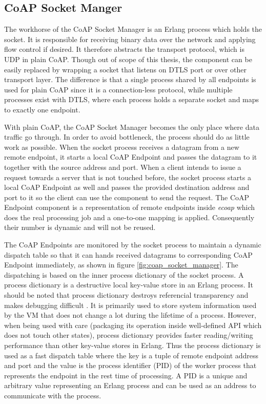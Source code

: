 \begin{figure}
\label{fig:ecoap_general_arch}
\end{figure}

\subsection{CoAP Socket Manger}\label{socket_manager}

The workhorse of the CoAP Socket Manager is an Erlang process which holds the socket. It is responsible for receiving binary data over the network and applying flow control if desired. It therefore abstracts the transport protocol, which is UDP in plain CoAP. Though out of scope of this thesis, the component can be easily replaced by wrapping a socket that listens on DTLS port or over other transport layer. The difference is that a single process shared by all endpoints is used for plain CoAP since it is a connection-less protocol, while multiple processes exist with DTLS, where each process holds a separate socket and maps to exactly one endpoint. 

With plain CoAP, the CoAP Socket Manager becomes the only place where data traffic go through. In order to avoid bottleneck, the process should do as little work as possible. When the socket process receives a datagram from a new remote endpoint, it starts a local CoAP Endpoint and passes the datagram to it together with the source address and port. When a client intends to issue a request towards a server that is not touched before, the socket process starts a local CoAP Endpoint as well and passes the provided destination address and port to it so the client can use the component to send the request. The CoAP Endpoint component is a representation of remote endpoints inside \textit{ecoap} which does the real processing job and a one-to-one mapping is applied. Consequently their number is dynamic and will not be reused. 

The CoAP Endpoints are monitored by the socket process to maintain a dynamic dispatch table so that it can hands received datagrams to corresponding CoAP Endpoint immediately, as shown in figure \ref{fig:coap_socket_manager}. The dispatching is based on the inner process dictionary of the socket process. A process dictionary is a destructive local key-value store in an Erlang process. It should be noted that process dictionary destroys referencial transparency and makes debugging difficult \cite{}. It is primarily used to store system information used by the VM that does not change a lot during the lifetime of a process. However, when being used with care (packaging its operation inside well-defined API which does not touch other states), process dictionary provides faster reading/writing performance than other key-value stores in Erlang. Thus the process dictionary is used as a fast dispatch table where the key is a tuple of remote endpoint address and port and the value is the process identifier (PID) of the worker process that represents the endpoint in the rest time of processing. A PID is a unique and arbitrary value representing an Erlang process and can be used as an address to communicate with the process. 

